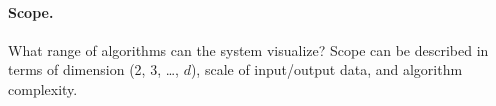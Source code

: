 




\paragraph{Scope.} What range of algorithms can the system visualize? Scope can
be described in terms of dimension (2, 3, \ldots, $d$), scale of input/output
data, and algorithm complexity.



